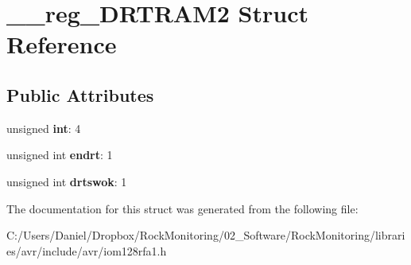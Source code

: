 \hypertarget{struct____reg___d_r_t_r_a_m2}{}\section{\+\_\+\+\_\+reg\+\_\+\+D\+R\+T\+R\+A\+M2 Struct Reference}
\label{struct____reg___d_r_t_r_a_m2}
\subsection*{Public Attributes}
\begin{DoxyCompactItemize}
\item 
unsigned {\bfseries int}\+: 4\hypertarget{struct____reg___d_r_t_r_a_m2_aecc72eeab0ee15a9512561df6895d1d8}{}\label{struct____reg___d_r_t_r_a_m2_aecc72eeab0ee15a9512561df6895d1d8}

\item 
unsigned int {\bfseries endrt}\+: 1\hypertarget{struct____reg___d_r_t_r_a_m2_aaabfcceddee9821a07696a30b0ac3688}{}\label{struct____reg___d_r_t_r_a_m2_aaabfcceddee9821a07696a30b0ac3688}

\item 
unsigned int {\bfseries drtswok}\+: 1\hypertarget{struct____reg___d_r_t_r_a_m2_ad448be4a5a3b5eafd220bc81911ef647}{}\label{struct____reg___d_r_t_r_a_m2_ad448be4a5a3b5eafd220bc81911ef647}

\end{DoxyCompactItemize}


The documentation for this struct was generated from the following file\+:\begin{DoxyCompactItemize}
\item 
C\+:/\+Users/\+Daniel/\+Dropbox/\+Rock\+Monitoring/02\+\_\+\+Software/\+Rock\+Monitoring/libraries/avr/include/avr/iom128rfa1.\+h\end{DoxyCompactItemize}
